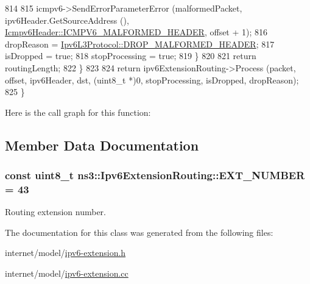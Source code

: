\begin{DoxyCode}
814 
815           icmpv6->SendErrorParameterError (malformedPacket, ipv6Header.GetSourceAddress (), 
      \hyperlink{classns3_1_1Icmpv6Header_ae9230cd167393f553a3c2ded106858caa7dd2df96e3d38d1988dbfc92f7fea0cb}{Icmpv6Header::ICMPV6\_MALFORMED\_HEADER}, offset + 1);
816           dropReason = \hyperlink{classns3_1_1Ipv6L3Protocol_a33c64db9bc35f71ff368b132bfffa37aaddfae41b279341b99d46df16e0d4ea7b}{Ipv6L3Protocol::DROP\_MALFORMED\_HEADER};
817           isDropped = \textcolor{keyword}{true};
818           stopProcessing = \textcolor{keyword}{true};
819         \}
820 
821       \textcolor{keywordflow}{return} routingLength;
822     \}
823 
824   \textcolor{keywordflow}{return} ipv6ExtensionRouting->Process (packet, offset, ipv6Header, dst, (uint8\_t *)0, stopProcessing, 
      isDropped, dropReason);
825 \}
\end{DoxyCode}


Here is the call graph for this function\+:




\subsection{Member Data Documentation}
\subsubsection[{\texorpdfstring{E\+X\+T\+\_\+\+N\+U\+M\+B\+ER}{EXT_NUMBER}}]{\setlength{\rightskip}{0pt plus 5cm}const uint8\+\_\+t ns3\+::\+Ipv6\+Extension\+Routing\+::\+E\+X\+T\+\_\+\+N\+U\+M\+B\+ER = 43\hspace{0.3cm}{\ttfamily [static]}}\hypertarget{classns3_1_1Ipv6ExtensionRouting_a357fb54942ed277827fab5a1a58df239}{}\label{classns3_1_1Ipv6ExtensionRouting_a357fb54942ed277827fab5a1a58df239}


Routing extension number. 



The documentation for this class was generated from the following files\+:\begin{DoxyCompactItemize}
\item 
internet/model/\hyperlink{ipv6-extension_8h}{ipv6-\/extension.\+h}\item 
internet/model/\hyperlink{ipv6-extension_8cc}{ipv6-\/extension.\+cc}\end{DoxyCompactItemize}
